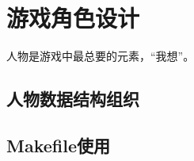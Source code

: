 \chapter{游戏角色设计}
人物是游戏中最总要的元素，“我想”。
\newpage
\section{人物数据结构组织}
\subsection{}
\subsection{}
\section{Makefile使用}
